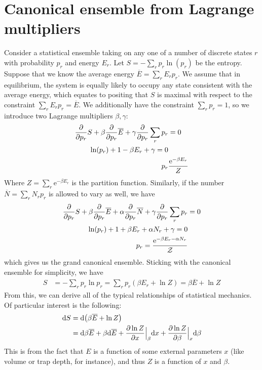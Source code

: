 \documentclass[11pt]{article}
\theoremstyle{remark}
\newcommand{\e}{\mathrm{e}}
\begin{document}
\section{Canonical ensemble from Lagrange multipliers}
Consider a statistical ensemble taking on any one of a number of discrete states
$r$ with probability $p_r$ and energy $E_r$. Let $S = -\sum_{r}p_r\ln(p_r)$ be
the entropy. Suppose that we know the average energy $\overline E = \sum_r E_r
p_r$. We assume that in equilibrium, the system is equally likely to occupy any
state consistent with the average energy, which equates to positing that $S$ is
maximal with respect to the constraint $\sum_r E_r p_r = \overline E$. We
additionally have the constraint $\sum_r p_r = 1$, so we
introduce two Lagrange multipliers $\beta, \gamma$:
\begin{align}
  \pdv{p_r}S + \beta \pdv{p_r}\overline E + \gamma \pdv{p_r}\sum_{r}p_r &= 0 \\
  \ln(p_r) + 1 - \beta E_r + \gamma = 0 \\
  p_r & \frac{\e^{-\beta E_r}}{Z}
\end{align}
Where $Z = \sum_r \e^{-\beta E_r}$ is the partition function. Similarly, if the number $\overline N = \sum_r N_r p_r$ is allowed to vary as
well, we have
\begin{align}
  \pdv{p_r}S + \beta \pdv{p_r}\overline E + \alpha \pdv{p_r}\overline N + \gamma \pdv{p_r}\sum_r p_r &= 0 \\
  \ln(p_r) + 1 + \beta E_r + \alpha N_r+ \gamma = 0 \\
  p_r = \frac{\e^{-\beta E_r - \alpha N_r}}{\mathcal Z}
\end{align}
which gives us the grand canonical ensemble. Sticking with the canonical
ensemble for simplicity, we have
\begin{align}
  S &= -\sum_r p_r \ln p_r = \sum_r p_r (\beta E_r + \ln Z) = \beta \overline E + \ln Z
\end{align}
From this, we can
derive all of the typical relationships of statistical mechanics. Of particular
interest is the following:
\begin{align}
  \dd S &= \dd (\beta \overline E + \ln Z)\\
  &= \dd \beta \overline E + \beta \dd \overline E + \pdv{\ln Z}{x}\Big|_\beta\dd x + \pdv{\ln
    Z}{\beta}\Big|_x\dd \beta
\end{align}
This is from the fact that $E$ is a function of some external parameters $x$
(like volume or trap depth, for instance), and thus $Z$ is a function of $x$ and
$\beta$.
\end{document}
